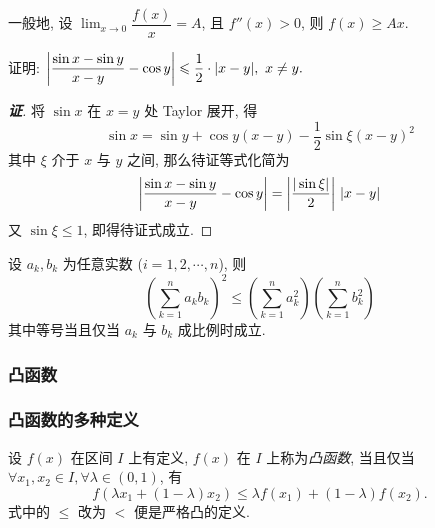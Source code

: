 \begin{inference}
    一般地, 设 $\displaystyle\lim_{x\to0}\dfrac{f(x)}{x}=A$, 且 $f''(x)>0$, 则 $f(x)\geqslant Ax.$
\end{inference}

\begin{example}
    证明: $\qty|\dfrac{\sin x-\sin y}{x-y}-\cos y|\leqslant \dfrac{1}{2}\cdot |x-y|,~x\neq y.$
\end{example}
\begin{proof}[{\songti \textbf{证}}]
    将 $\sin x$ 在 $x=y$ 处 Taylor 展开, 得 $$\sin x=\sin y+\cos y(x-y)-\dfrac{1}{2}\sin \xi(x-y)^2$$
    其中 $\xi$ 介于 $x$ 与 $y$ 之间, 那么待证等式化简为 $$\qty|\dfrac{\sin x-\sin y}{x-y}-\cos y|=\qty|\dfrac{|\sin\xi|}{2}|~|x-y|$$
    又 $\sin \xi\leqslant 1$, 即得待证式成立.
\end{proof}

\begin{theorem}
    设 $a_k,b_k$ 为任意实数 ($i=1,2,\cdots,n$), 则
    $$\displaystyle\left( \sum_{k=1}^n a_k b_k \right)^{\!\!2}\leqslant\left( \sum_{k=1}^n a_k^2 \right) \left( \sum_{k=1}^n b_k^2 \right) $$
    其中等号当且仅当 $a_k$ 与 $b_k$ 成比例时成立.
\end{theorem}

\subsubsection{凸函数}

\subsubsection{凸函数的多种定义}

\begin{definition}[凸函数 A]
    设 $ f(x) $ 在区间 $ I $ 上有定义, $f(x) $ 在 $ I $ 上称为\textit{凸函数}, 当且仅当 $ \forall x_{1} ,  x_{2} \in I, \forall \lambda \in(0,1)$, 有
    $$f\left(\lambda x_{1}+(1-\lambda) x_{2}\right) \leqslant \lambda f\left(x_{1}\right)+(1-\lambda) f\left(x_{2}\right) .$$
    式中的 $\leqslant$ 改为 $<$ 便是严格凸的定义.
\end{definition}

